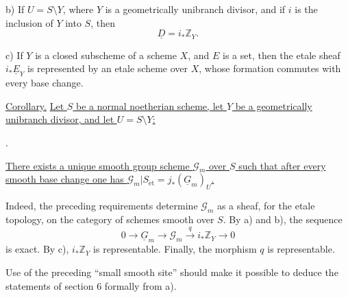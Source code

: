 \smallskip
\noindent b) If $U=S\setminus Y$, where $Y$ is a geometrically unibranch
divisor, and if $i$ is the inclusion of $Y$ into $S$, then
\[
 \underline D=i_*\mathbb Z_Y.
\]

\smallskip
\noindent c) If $Y$ is a closed subscheme of a scheme $X$, and $E$ is a set,
then the etale sheaf $i_*\underline E_Y$ is represented by an etale scheme
over $X$, whose formation commutes with every base change.

\medskip
\noindent\underline{Corollary.}  \underline{Let $S$ be a normal noetherian
scheme, let $Y$ be a geometrically unibranch divisor, and let
$U=S\setminus Y$:}
\begin{center}
\qquad .
\end{center}
\underline{There exists a unique smooth group scheme $\mathcal G_m$ over
$S$ such that after every smooth base change one has
$\mathcal G_m|S_{\mathrm{\acute{e}t}}=j_*(\underline G_m)_U$.}

Indeed, the preceding requirements determine $\mathcal G_m$ as a sheaf, for
the etale topology, on the category of schemes smooth over $S$.  By a) and
b), the sequence
\[
 0\longrightarrow\underline G_m\longrightarrow\mathcal G_m
 \xrightarrow{\ q\ }i_*\mathbb Z_Y\longrightarrow0
\]
is exact.  By c), $i_*\mathbb Z_Y$ is representable.  Finally, the morphism
$q$ is representable.

Use of the preceding ``small smooth site'' should make it possible to deduce
the statements of section 6 formally from a).

